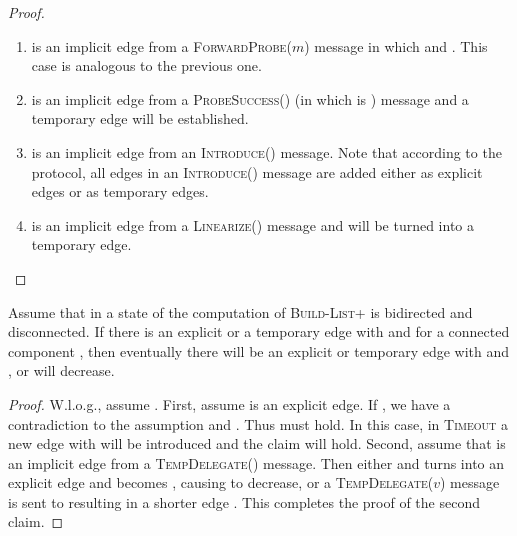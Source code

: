 \documentclass[a4paper,USenglish]{lipics}
\newcommand{\blp}{\textsc{Build-List+}\xspace}
\newcommand{\linearize}[1]{\textsc{Linearize(\ensuremath{#1})}\xspace}
\newcommand{\introduce}[1]{\textsc{Introduce(\ensuremath{#1})}\xspace}
\newcommand{\tempdelegate}[1]{\textsc{TempDelegate(\ensuremath{#1})}\xspace}
\newcommand{\timeout}{\textsc{Timeout}\xspace}
\newcommand{\forwardprobe}[1]{\textsc{ForwardProbe(\ensuremath{#1})}\xspace}
\newcommand{\psuccess}[1]{\textsc{ProbeSuccess(\ensuremath{#1})}\xspace}
\begin{document}
\begin{proof}
\begin{enumerate}
	The only case when a \forwardprobe{m} message is no longer delegated is if  is empty (in which there is nothing left to prove), or when  for a node .
	In the latter case, for each node remaining in , a temporary edge is created.
  \item  is an implicit edge from a \forwardprobe{m} message in which  and .
	This case is analogous to the previous one.
  \item  is an implicit edge from a \psuccess{} (in which  is ) message and a temporary edge  will be established.
  \item  is an implicit edge from an \introduce{} message.
	Note that according to the protocol, all edges in an \introduce{} message are added either as explicit edges or as temporary edges.
  \item  is an implicit edge from a \linearize{} message and  will be turned into a temporary edge.
 \end{enumerate} 
\end{proof}
\begin{lemma}\label{lem:temporary_will_shorten_or_phi_will_decrease}
  Assume that in a state of the computation of \blp  is bidirected and disconnected.
  If there is an explicit or a temporary edge  with  and  for a connected component , then eventually there will be an explicit or temporary edge  with  and , or  will decrease.
 \end{lemma}

\begin{proof}
  W.l.o.g., assume .
  First, assume  is an explicit edge. 
  If , we have a contradiction to the assumption  and .
  Thus  must hold. 
  In this case, in \timeout a new edge  with  will be introduced and the claim will hold.
  Second, assume that  is an implicit edge from a \tempdelegate{} message. 
  Then either  and  turns into an explicit edge and  becomes , causing  to decrease, or a \tempdelegate{v} message is sent to  resulting in a shorter edge .
  This completes the proof of the second claim.
\end{proof}
\end{document}

